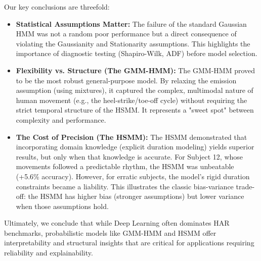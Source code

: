 \documentclass[11pt,a4paper]{article}
\begin{document}
Our key conclusions are threefold:
\begin{itemize}
    \item \textbf{Statistical Assumptions Matter:} The failure of the standard Gaussian HMM was not a random poor performance but a direct consequence of violating the Gaussianity and Stationarity assumptions. This highlights the importance of diagnostic testing (Shapiro-Wilk, ADF) before model selection.
    
    \item \textbf{Flexibility vs. Structure (The GMM-HMM):} The GMM-HMM proved to be the most robust general-purpose model. By relaxing the emission assumption (using mixtures), it captured the complex, multimodal nature of human movement (e.g., the heel-strike/toe-off cycle) without requiring the strict temporal structure of the HSMM. It represents a "sweet spot" between complexity and performance.
    
    \item \textbf{The Cost of Precision (The HSMM):} The HSMM demonstrated that incorporating domain knowledge (explicit duration modeling) yields superior results, but only when that knowledge is accurate. For Subject 12, whose movements followed a predictable rhythm, the HSMM was unbeatable (+5.6\% accuracy). However, for erratic subjects, the model's rigid duration constraints became a liability. This illustrates the classic bias-variance trade-off: the HSMM has higher bias (stronger assumptions) but lower variance when those assumptions hold.
\end{itemize}

Ultimately, we conclude that while Deep Learning often dominates HAR benchmarks, probabilistic models like GMM-HMM and HSMM offer interpretability and structural insights that are critical for applications requiring reliability and explainability.
\end{document}
